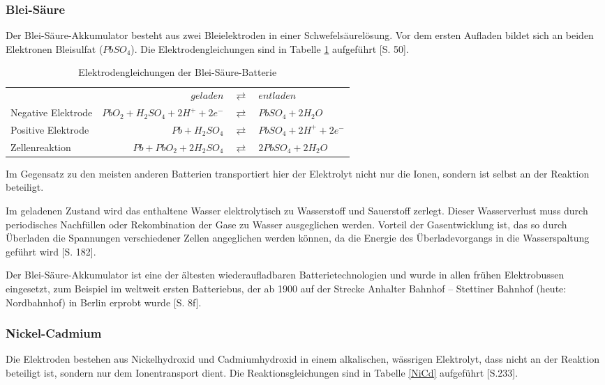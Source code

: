 \subsubsection{Blei-Säure}
Der Blei-Säure-Akkumulator besteht aus zwei Bleielektroden in einer Schwefelsäurelösung. Vor dem ersten Aufladen bildet sich an beiden Elektronen Bleisulfat ($PbSO_4$). Die Elektrodengleichungen sind in Tabelle \ref{Pb} aufgeführt \cite{KiehneBattery}[S. 50].

\begin{table}\centering
  \begin{tabularx}{\linewidth}{XrcX}
  	                   &                       $geladen$ & $\rightleftarrows$ & $entladen$             \\
  	Negative Elektrode & $PbO_2 + H_2SO_4 + 2H^+ + 2e^-$ & $\rightleftarrows$ & $PbSO_4 + 2H_2O$       \\
  	Positive Elektrode &                  $Pb + H_2SO_4$ & $\rightleftarrows$ & $PbSO_4 + 2H^+ + 2e^-$ \\ \midrule
  	Zellenreaktion     &         $Pb + PbO_2 + 2H_2SO_4$ & $\rightleftarrows$ & $2PbSO_4 + 2H_2O$      \\
  \end{tabularx}
  \caption{Elektrodengleichungen der Blei-Säure-Batterie}
  \label{Pb}
\end{table}

Im Gegensatz zu den meisten anderen Batterien transportiert hier der Elektrolyt nicht nur die Ionen, sondern ist selbst an der Reaktion beteiligt.

Im geladenen Zustand wird das enthaltene Wasser elektrolytisch zu Wasserstoff und Sauerstoff zerlegt. Dieser Wasserverlust muss durch periodisches Nachfüllen oder Rekombination der Gase zu Wasser ausgeglichen werden. Vorteil der Gasentwicklung ist, das so durch Überladen die Spannungen verschiedener Zellen angeglichen werden können, da die Energie des Überladevorgangs in die Wasserspaltung geführt wird \cite{tub_aleph001746639}[S. 182].

Der Blei-Säure-Akkumulator ist eine der ältesten wiederaufladbaren Batterietechnologien und wurde in allen frühen Elektrobussen eingesetzt, zum Beispiel im weltweit ersten Batteriebus, der ab 1900 auf der Strecke Anhalter Bahnhof – Stettiner Bahnhof (heute: Nordbahnhof) in Berlin erprobt wurde \cite{Risch:1957}[S. 8f].

\subsubsection{Nickel-Cadmium}
Die Elektroden bestehen aus Nickelhydroxid und Cadmiumhydroxid in einem alkalischen, wässrigen Elektrolyt, dass nicht an der Reaktion beteiligt ist, sondern nur dem Ionentransport dient. Die Reaktionsgleichungen sind in Tabelle \ref{NiCd} aufgeführt \cite{Sterner:2014}[S.233].

